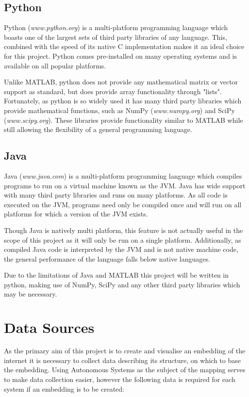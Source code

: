 \subsection{Python}
Python (\textit{www.python.org}) is a multi-platform programming language which boasts one of the largest sets of third party libraries of any language. This, combined with the speed of its native C implementation makes it an ideal choice for this project. Python comes pre-installed on many operating systems and is available on all popular platforms.

Unlike MATLAB, python does not provide any mathematical matrix or vector support as standard, but does provide array functionality through "lists". Fortunately, as python is so widely used it has many third party libraries which provide mathematical functions, such as NumPy (\textit{www.numpy.org}) and SciPy (\textit{www.scipy.org}). These libraries provide functionality similar to MATLAB while still allowing the flexibility of a general programming language.

\subsection{Java}
Java (\textit{www.java.com}) is a multi-platform programming language which compiles programs to run on a virtual machine known as the JVM. Java has wide support with many third party libraries and runs on many platforms. As all code is executed on the JVM, programs need only be compiled once and will run on all platforms for which a version of the JVM exists. 

Though Java is natively multi platform, this feature is not actually useful in the scope of this project as it will only be run on a single platform. Additionally, as compiled Java code is interpreted by the JVM and is not native machine code, the general performance of the language falls below native languages.

Due to the limitations of Java and MATLAB this project will be written in python, making use of NumPy, SciPy and any other third party libraries which may be necessary.

\section{Data Sources}
\label{sec:DesignDataSources}
As the primary aim of this project is to create and visualise an embedding of the internet it is necessary to collect data describing its structure, on which to base the embedding. Using Autonomous Systems as the subject of the mapping serves to make data collection easier, however the following data is required for each system if an embedding is to be created:

